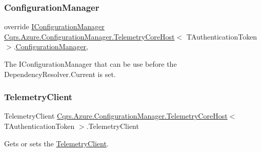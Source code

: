 \subsubsection{\texorpdfstring{Configuration\+Manager}{ConfigurationManager}}
{\footnotesize\ttfamily override \hyperlink{interfaceCqrs_1_1Configuration_1_1IConfigurationManager}{I\+Configuration\+Manager} \hyperlink{classCqrs_1_1Azure_1_1ConfigurationManager_1_1TelemetryCoreHost}{Cqrs.\+Azure.\+Configuration\+Manager.\+Telemetry\+Core\+Host}$<$ T\+Authentication\+Token $>$.\hyperlink{classCqrs_1_1Configuration_1_1ConfigurationManager}{Configuration\+Manager}\hspace{0.3cm}{\ttfamily [get]}, {\ttfamily [protected]}}



The I\+Configuration\+Manager that can be use before the Dependency\+Resolver.\+Current is set. 

\mbox{\label{classCqrs_1_1Azure_1_1ConfigurationManager_1_1TelemetryCoreHost_a8fe3736539c6f97ea4ac088cebbc19e5_a8fe3736539c6f97ea4ac088cebbc19e5}} 
\subsubsection{\texorpdfstring{Telemetry\+Client}{TelemetryClient}}
{\footnotesize\ttfamily Telemetry\+Client \hyperlink{classCqrs_1_1Azure_1_1ConfigurationManager_1_1TelemetryCoreHost}{Cqrs.\+Azure.\+Configuration\+Manager.\+Telemetry\+Core\+Host}$<$ T\+Authentication\+Token $>$.Telemetry\+Client\hspace{0.3cm}{\ttfamily [get]}}



Gets or sets the \hyperlink{classCqrs_1_1Azure_1_1ConfigurationManager_1_1TelemetryCoreHost_a8fe3736539c6f97ea4ac088cebbc19e5_a8fe3736539c6f97ea4ac088cebbc19e5}{Telemetry\+Client}. 

